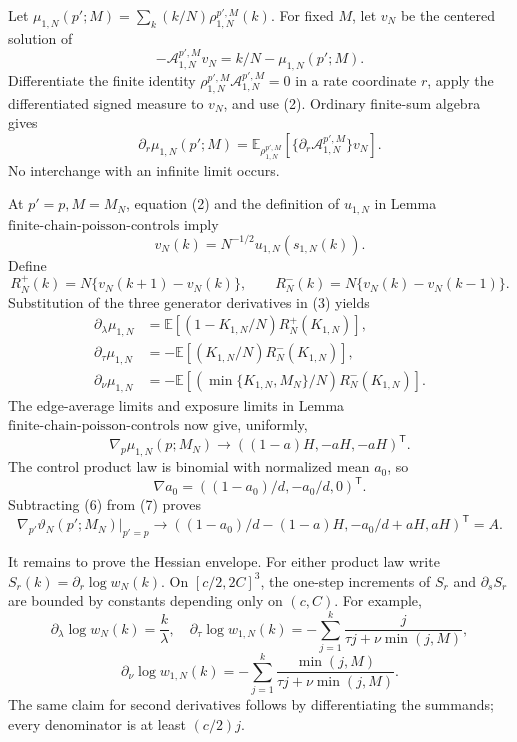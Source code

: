 Let \(\mu_{1,N}(p';M)=\sum_k(k/N)\rho_{1,N}^{p',M}(k)\).  For fixed \(M\), let \(v_N\) be the centered solution of
\[
 -\mathcal A_{1,N}^{p',M}v_N=k/N-\mu_{1,N}(p';M).             \tag{2}
\]
Differentiate the finite identity \(\rho_{1,N}^{p',M}\mathcal A_{1,N}^{p',M}=0\) in a rate coordinate \(r\), apply the differentiated signed measure to \(v_N\), and use (2).  Ordinary finite-sum algebra gives
\[
 \partial_r\mu_{1,N}(p';M)
 =\mathbb E_{\rho_{1,N}^{p',M}}
 [\{\partial_r\mathcal A_{1,N}^{p',M}\}v_N].                \tag{3}
\]
No interchange with an infinite limit occurs.

At \(p'=p,M=M_N\), equation (2) and the definition of \(u_{1,N}\) in Lemma \(\mathrm{finite\mbox{-}chain\mbox{-}poisson\mbox{-}controls}\) imply
\[
 v_N(k)=N^{-1/2}u_{1,N}(s_{1,N}(k)).                           \tag{4}
\]
Define
\[
 R_N^+(k)=N\{v_N(k+1)-v_N(k)\},
 \qquad
 R_N^-(k)=N\{v_N(k)-v_N(k-1)\}.
\]
Substitution of the three generator derivatives in (3) yields
\[
 \begin{split}
 \partial_\lambda\mu_{1,N}
 &=\mathbb E[(1-K_{1,N}/N)R_N^+(K_{1,N})],\\
 \partial_\tau\mu_{1,N}
 &=-\mathbb E[(K_{1,N}/N)R_N^-(K_{1,N})],\\
 \partial_\nu\mu_{1,N}
 &=-\mathbb E[(\min\{K_{1,N},M_N\}/N)R_N^-(K_{1,N})].        \tag{5}
 \end{split}
\]
The edge-average limits and exposure limits in Lemma \(\mathrm{finite\mbox{-}chain\mbox{-}poisson\mbox{-}controls}\) now give, uniformly,
\[
 \nabla_p\mu_{1,N}(p;M_N)
 \longrightarrow((1-a)H,-aH,-aH)^{\mathsf T}.                \tag{6}
\]
The control product law is binomial with normalized mean \(a_0\), so
\[
 \nabla a_0=((1-a_0)/d,-a_0/d,0)^{\mathsf T}.                 \tag{7}
\]
Subtracting (6) from (7) proves
\[
 \nabla_{p'}\vartheta_N(p';M_N)|_{p'=p}
 \longrightarrow((1-a_0)/d-(1-a)H,-a_0/d+aH,aH)^{\mathsf T}=A. \tag{8}
\]

It remains to prove the Hessian envelope.  For either product law write \(S_r(k)=\partial_r\log w_N(k)\).  On \([c/2,2C]^3\), the one-step increments of \(S_r\) and \(\partial_sS_r\) are bounded by constants depending only on \((c,C)\).  For example,
\[
 \partial_\lambda\log w_N(k)=\frac{k}{\lambda},
 \quad
 \partial_\tau\log w_{1,N}(k)
 =-\sum_{j=1}^k\frac{j}{\tau j+\nu\min(j,M)},
\]
\[
 \partial_\nu\log w_{1,N}(k)
 =-\sum_{j=1}^k\frac{\min(j,M)}{\tau j+\nu\min(j,M)}.        \tag{9}
\]
The same claim for second derivatives follows by differentiating the summands; every denominator is at least \((c/2)j\).


